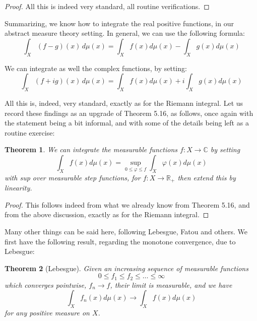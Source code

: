 \documentclass[12pt]{amsbook}
\newtheorem{theorem}{Theorem}[chapter]
\begin{document}
\begin{proof}
All this is indeed very standard, all routine verifications.
\end{proof}

Summarizing, we know how to integrate the real positive functions, in our abstract measure theory setting. In general, we can use the following formula:
$$\int_X(f-g)(x)\,d\mu(x)=\int_Xf(x)d\mu(x)-\int_Xg(x)d\mu(x)$$

We can integrate as well the complex functions, by setting:
$$\int_X(f+ig)(x)\,d\mu(x)=\int_Xf(x)d\mu(x)+i\int_Xg(x)d\mu(x)$$

All this is, indeed, very standard, exactly as for the Riemann integral. Let us record these findings as an upgrade of Theorem 5.16, as follows, once again with the statement being a bit informal, and with some of the details being left as a routine exercise:

\begin{theorem}
We can integrate the measurable functions $f:X\to\mathbb C$ by setting
$$\int_Xf(x)d\mu(x)=\sup_{0\leq\varphi\leq f}\int_X\varphi(x)d\mu(x)$$
with sup over measurable step functions, for $f:X\to\mathbb R_+$ then extend this by linearity.
\end{theorem}

\begin{proof}
This follows indeed from what we already know from Theorem 5.16, and from the above discussion, exactly as for the Riemann integral.
\end{proof}

Many other things can be said here, following Lebesgue, Fatou and others. We first have the following result, regarding the monotone convergence, due to Lebesgue:

\begin{theorem}[Lebesgue]
Given an increasing sequence of measurable functions 
$$0\leq f_1\leq f_2\leq\ldots\leq\infty$$
which converges pointwise, $f_n\to f$, their limit is measurable, and we have
$$\int_Xf_n(x)d\mu(x)\to\int_Xf(x)d\mu(x)$$
for any positive measure on $X$.
\end{theorem}
\end{document}
